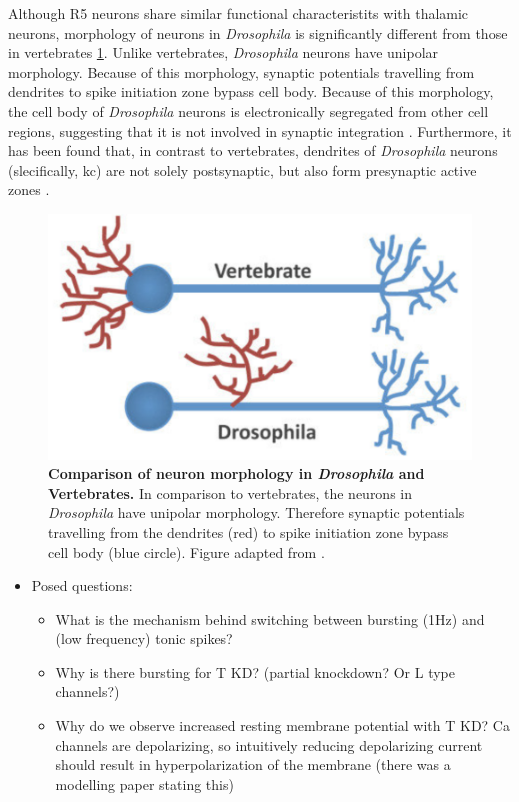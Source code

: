 \documentclass[../main.tex]{subfiles}
\begin{document}
Although R5 neurons share similar functional characteristits with thalamic neurons,
morphology of neurons in \textit{Drosophila} is significantly different from those in vertebrates
\ref{fig:morphology_drosphila_vs_mammalian}. 
Unlike vertebrates, \textit{Drosophila} neurons have unipolar morphology. Because of this morphology,
synaptic potentials travelling from dendrites to spike initiation zone bypass cell body.
Because of this morphology, the cell body of \textit{Drosophila} neurons is
electronically segregated from other cell regions, suggesting that it is not involved
in synaptic integration \cite{gouwensSignalPropagationDrosophila2009,tuthillLessonsCompartmentalModel2009}.
Furthermore, it has been found that, in contrast to vertebrates, dendrites of
\textit{Drosophila} neurons (slecifically, \gls{kc}) are not solely postsynaptic, but
also form presynaptic active zones \cite{christiansenPresynapsesKenyonCell2011}.

\begin{figure}[!t]
    \centering
    \includegraphics[width=0.55\linewidth]{../img/modelling_r5/examples/drosophila_neuron_morphology.png}
    \caption[Neuron morphology in \textit{Drosophila} and Vertebrates]{
        \textbf{Comparison of neuron morphology in \textit{Drosophila} and Vertebrates.}
        In comparison to vertebrates,
        the neurons in \textit{Drosophila} have unipolar morphology. Therefore synaptic potentials
        travelling from the dendrites (red) to spike initiation zone bypass cell body
        (blue circle). Figure adapted from \cite{spindlerBazookaMediatesSecondary2011}.
    }
    \label{fig:morphology_drosphila_vs_mammalian}
\end{figure}

\color{red}
\begin{itemize}
    \item Posed questions:
    \begin{itemize}
        \item What is the mechanism behind switching between bursting (1Hz) and (low frequency) tonic spikes?
        \item Why is there bursting for T KD? (partial knockdown? Or L type channels?)
        \item Why do we observe increased resting membrane potential with T KD? Ca channels are depolarizing, so
        intuitively reducing depolarizing current should result in hyperpolarization of the membrane
        (there was a modelling paper stating this)
    \end{itemize}
\end{itemize}
\color{black}
\end{document}
